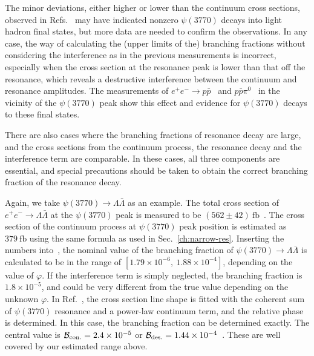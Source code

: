 \documentclass[%
preprint,
 amsmath,amssymb,
 aps,
]{revtex4-2}
\newcommand{\br}{{\cal B}}
\newcommand{\piz}{\pi^0}
\newcommand{\EE}{e^+e^-}
\newcommand{\ppbar}{p\bar{p}}
\newcommand{\psipp}{\psi(3770)}
\newcommand{\fb}{\mathrm{fb}}
\begin{document}
The minor deviations, either higher or lower than the continuum cross sections, observed in
Refs.~\cite{BESIII:2021ftf,BESIII:2013ujm,BES:2007zan,CLEO:2005tkm,CLEO:2005zrs}
may have indicated nonzero $\psipp$ decays into light hadron final states,
but more data are needed to confirm the observations. 
In any case, the way of calculating the (upper limits of the) branching fractions 
without considering the interference as in the previous measurements
is incorrect, especially when the cross section at the resonance peak
is lower than that off the resonance, 
which reveals a destructive interference between the continuum and 
resonance amplitudes.
The measurements of $\EE\to \ppbar$~\cite{BESIII:ppbar} and 
$\ppbar\piz$~\cite{BESIII:pppi0} in the vicinity of the $\psipp$ peak 
show this effect and evidence for $\psipp$ decays to these final states. 

There are also cases where the branching fractions of resonance decay 
are large, and the cross sections from the continuum process, the 
resonance decay and the interference term are comparable. In 
these cases, all three components
are essential, and special precautions should be taken to obtain the correct
branching fraction of the resonance decay.

Again, we take $\psipp\to\Lambda\bar{\Lambda}$ as an example.
The total cross section of $\EE\to\Lambda\bar{\Lambda}$ at the $\psipp$ peak 
is measured to be $(562\pm 42)~\fb$~\cite{bes3-cs-lambda}. 
The cross section of the continuum process at $\psipp$ peak position is estimated as 
$379~\fb$ using the same formula as used in Sec.~\ref{ch:narrow-res}. 
Inserting the numbers into~, the nominal 
value of the branching fraction of $\psipp\to\Lambda\bar{\Lambda}$ is calculated
to be in the range of $[1.79\times10^{-6},~1.88\times10^{-4}]$, depending on the value 
of $\varphi$. If the interference term is simply neglected, the branching fraction
is $1.8\times10^{-5}$, and could be very different from the true value depending on
the unknown $\varphi$. 
In Ref.~\cite{bes3-cs-lambda}, the cross section line shape is fitted with the 
coherent sum of $\psipp$ resonance and a power-law continuum term, and the relative 
phase is determined. In this case, the branching fraction can be determined exactly. 
The central value is $\br_{\rm con.}=2.4\times10^{-5}$ or 
$\br_{\rm des.}=1.44\times10^{-4}$~\cite{bes3-cs-lambda}. 
These are well covered by our estimated range above.
\end{document}
